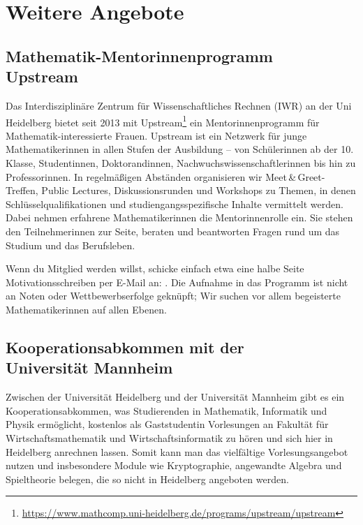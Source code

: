 \vfill\eject
\section{Weitere Angebote}

\subsection{Mathematik-Mentorinnenprogramm \\Upstream}
Das Interdisziplinäre Zentrum für Wissenschaftliches Rechnen (IWR) an der Uni Heidelberg bietet seit 2013 mit Upstream\footnote{\url{https://www.mathcomp.uni-heidelberg.de/programs/upstream/upstream}} ein Mentorinnenprogramm für Mathematik-interessierte Frauen. Upstream ist ein Netzwerk für junge Mathematikerinnen in allen Stufen der Ausbildung -- von Schülerinnen ab der 10. Klasse, Studentinnen, Doktorandinnen, Nachwuchswissenschaftlerinnen bis hin zu Professorinnen. In regelmäßigen Abständen organisieren wir Meet\,\&\,Greet-Treffen, Public Lectures, Diskussionsrunden und Workshops zu Themen, in denen Schlüsselqualifikationen und studiengangsspezifische Inhalte vermittelt werden. Dabei nehmen erfahrene Mathematikerinnen die Mentorinnenrolle ein. Sie stehen den Teilnehmerinnen zur Seite, beraten und beantworten Fragen rund um das Studium und das Berufsleben.

Wenn du Mitglied werden willst, schicke einfach etwa eine halbe Seite Motivationsschreiben per E-Mail an: . Die Aufnahme in das Programm ist nicht an Noten oder Wettbewerbserfolge geknüpft; Wir suchen vor allem begeisterte Mathematikerinnen auf allen Ebenen.

\subsection{Kooperationsabkommen mit der \\Universität Mannheim}
Zwischen der Universität Heidelberg und der Universität Mannheim gibt es ein Kooperationsabkommen, was Studierenden in Mathematik, Informatik und Physik ermöglicht, kostenlos als Gaststudentin Vorlesungen an Fakultät für Wirtschaftsmathematik und Wirtschaftsinformatik zu hören und sich hier in Heidelberg anrechnen lassen. 
Somit kann man das vielfältige Vorlesungsangebot nutzen und insbesondere Module wie Kryptographie, angewandte Algebra und Spieltheorie belegen, die so nicht in Heidelberg angeboten werden.